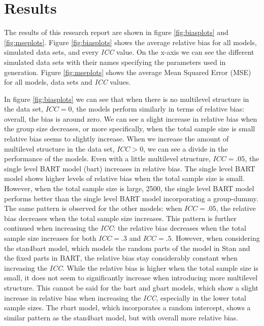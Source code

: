 \documentclass[10pt, a4paper, titlepage]{article}
\begin{document}
\section{Results}
\graphicspath{{./graphs/}}

The results of this research report are shown in figure \ref{fig:biasplots} and \ref{fig:mseplots}. Figure \ref{fig:biasplots} shows the average relative bias for all models, simulated data sets, and every \textit{ICC} value. On the x-axis we can see the different simulated data sets with their names specifying the parameters used in generation. Figure \ref{fig:mseplots} shows the average Mean Squared Error (MSE) for all models, data sets and \textit{ICC} values.

In figure \ref{fig:biasplots} we can see that when there is no multilevel structure in the data set, $ICC = 0$, the models perform similarly in terms of relative bias: overall, the bias is around zero. We can see a slight increase in relative bias when the group size decreases, or more specifically, when the total sample size is small relative bias seems to slightly increase. When we increase the amount of multilevel structure in the data set, $ICC > 0$, we can see a divide in the performance of the models. Even with a little multilevel structure, $ICC = .05$, the single level BART model (bart) increases in relative bias. The single level BART model shows higher levels of relative bias when the total sample size is small. However, when the total sample size is large, 2500, the single level BART model performs better than the single level BART model incorporating a group-dummy. The same pattern is observed for the other models: when $ICC = .05$, the relative bias decreases when the total sample size increases. This pattern is further continued when increasing the \textit{ICC}: the relative bias decreases when the total sample size increases for both $ICC = .3$ and $ICC = .5$. However, when considering the stan4bart model, which models the random parts of the model in Stan and the fixed parts in BART, the relative bias stay considerably constant when increasing the \textit{ICC}. While the relative bias is higher when the total sample size is small, it does not seem to significantly increase when introducing more multilevel structure. This cannot be said for the bart and gbart models, which show a slight increase in relative bias when increasing the \textit{ICC}, especially in the lower total sample sizes. The rbart model, which incorporates a random intercept, shows a similar pattern as the stan4bart model, but with overall more relative bias.
\end{document}
